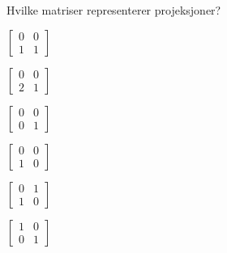 \begin{oppgave}
Hvilke matriser representerer projeksjoner?
\noindent
\begin{minipage}{0.14\textwidth}
\begin{punkt}
$
\begin{bmatrix}
 0 & 0\\
 1 & 1
\end{bmatrix}
$
\end{punkt}
\end{minipage}
\begin{minipage}{0.14\textwidth}
\begin{punkt}
$
\begin{bmatrix}
 0 & 0\\
 2 & 1
\end{bmatrix}
$
\end{punkt}
\end{minipage}
\begin{minipage}{0.14\textwidth}
\begin{punkt}
$
\begin{bmatrix}
 0 & 0\\
 0 & 1
\end{bmatrix}
$
\end{punkt}
\end{minipage}
\begin{minipage}{0.14\textwidth}
\begin{punkt}
$
\begin{bmatrix}
 0 & 0\\
 1 & 0
\end{bmatrix}
$
\end{punkt}
\end{minipage}
\begin{minipage}{0.14\textwidth}
\begin{punkt}
$
\begin{bmatrix}
 0 & 1\\
 1 & 0
\end{bmatrix}
$
\end{punkt}
\end{minipage}
\begin{minipage}{0.14\textwidth}
\begin{punkt}
$
\begin{bmatrix}
 1 & 0\\
 0 & 1
\end{bmatrix}
$
\end{punkt}
\end{minipage}
\end{oppgave}



